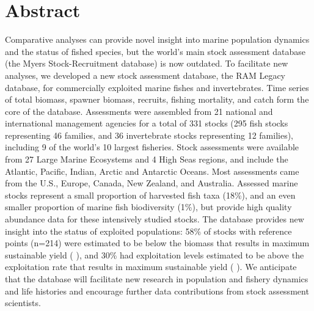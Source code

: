 \section*{Abstract}

Comparative analyses can provide novel insight into marine population dynamics and the status of fished species, but the world's main stock assessment database (the Myers Stock-Recruitment database) is now outdated.  
To facilitate new analyses, we developed a new stock assessment database, the RAM Legacy database, for commercially exploited marine fishes and invertebrates. 
Time series of total biomass, spawner biomass, recruits, fishing mortality, and catch form the core of the database. 
Assessments were assembled from 21 national and international management agencies for a total of 331 stocks (295 fish stocks representing 46 families, and 36 invertebrate stocks representing 12 families), including 9 of the world's 10 largest fisheries. Stock assessments were available from 27 Large Marine Ecosystems and 4 High Seas regions, and include the Atlantic, Pacific, Indian, Arctic and Antarctic Oceans. 
Most assessments came from the U.S., Europe, Canada, New Zealand, and Australia. Assessed marine stocks represent a small proportion of harvested fish taxa (18\%), and an even smaller proportion of marine fish biodiversity (1\%), but provide high quality abundance data for these intensively studied stocks. 
The database provides new insight into the status of exploited populations: 58\% of stocks with reference points (n=214) were estimated to be below the biomass that results in maximum sustainable yield ( ), and 30\% had exploitation levels estimated to be above the exploitation rate that results in maximum sustainable yield ( ).
We anticipate that the database will facilitate new research in population and fishery dynamics and life histories and encourage further data contributions from stock assessment scientists.

